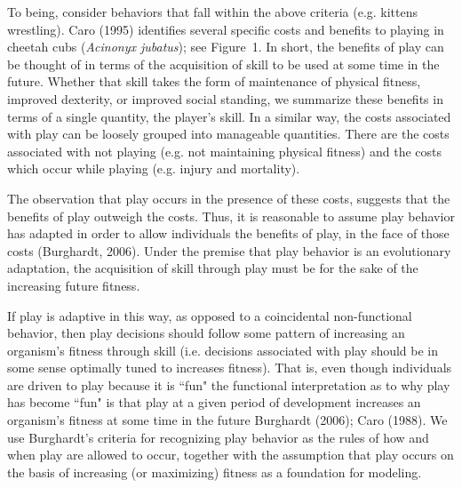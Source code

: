 \documentclass[12pt, letterpaper, fleqn]{article}
\begin{document}
To being, consider behaviors that fall within the above criteria (e.g. kittens wrestling).  
Caro (1995) identifies several specific costs and benefits to playing in cheetah cubs ({\it Acinonyx jubatus}); see \mbox{Figure 1}. 
% 
In short, the benefits of play can be thought of in terms of the acquisition of skill to be used at some time in the future.
%
Whether that skill takes the form of maintenance of physical fitness, improved dexterity, or improved social standing,  we summarize these benefits  in terms of a single quantity, the player's skill. %
%
In a similar way, the costs associated with play can be loosely grouped into manageable quantities.
%
There are the costs associated with not playing (e.g. not maintaining physical fitness) and the costs which occur while playing (e.g. injury and mortality).

%
%

%
The observation that play occurs in the presence of these costs, suggests that the benefits of play outweigh the costs.
%
Thus, it is reasonable to assume play behavior has adapted in order to allow individuals the benefits of play, in the face of those costs (Burghardt, 2006).  
Under the premise that play behavior is an evolutionary adaptation, the acquisition of skill through play must be for the sake of the increasing future fitness. 

%
%

%
If play is adaptive in this way, as opposed to a coincidental non-functional behavior, then play decisions should follow some pattern of increasing an organism's fitness through skill (i.e. decisions associated with play should be in some sense optimally tuned to increases fitness). %
%
That is, even though individuals are driven to play because it is ``fun" the functional interpretation as to why play has become ``fun" is that play at a given period of development increases an organism's fitness at some time in the future Burghardt (2006); Caro (1988).
%
We use Burghardt's criteria for recognizing play behavior as the rules of how and when play are allowed to occur, together with the assumption that play occurs on the basis of increasing (or maximizing) fitness as a foundation for modeling.
\end{document}
